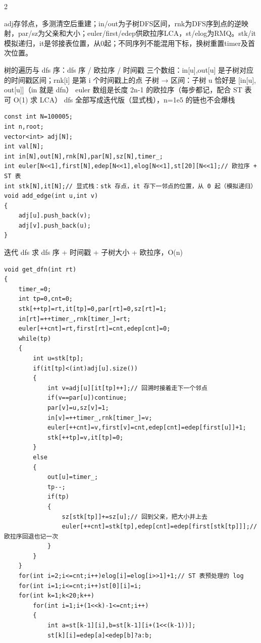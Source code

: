 \documentclass[UTF8,fontset=fandol,a4paper,twoside]{ctexart}
\newcommand{\note}[1]{{\fontsize{10}{12}\selectfont #1\par}}
\begin{document}
\begin{multicols}{2}
\note{adj存邻点，多测清空后重建；in/\allowbreak{}out为子树DFS区间，rnk为DFS序到点的逆映射，par/\allowbreak{}sz为父亲和大小；euler/\allowbreak{}first/\allowbreak{}edep供欧拉序LCA，st/\allowbreak{}elog为RMQ。stk/\allowbreak{}it模拟递归，it是邻接表位置，从0起；不同序列不能混用下标，换树重置timer及首次位置。}
\note{树的遍历与 dfs 序：dfs 序 /\allowbreak{} 欧拉序 /\allowbreak{} 时间戳 三个数组：in[\allowbreak{}u]\allowbreak{},\allowbreak{}out[\allowbreak{}u]\allowbreak{} 是子树对应的时间戳区间；rnk[\allowbreak{}i]\allowbreak{} 是第 i 个时间戳上的点 子树 → 区间：子树 u 恰好是 [\allowbreak{}in[\allowbreak{}u]\allowbreak{},\allowbreak{} out[\allowbreak{}u]\allowbreak{}]\allowbreak{}（in 就是 dfn） euler 数组是长度 2n-\allowbreak{}1 的欧拉序（每步都记，配合 ST 表可 O(\allowbreak{}1)\allowbreak{} 求 LCA） dfs 全部写成迭代版（显式栈），n=\allowbreak{}1e5 的链也不会爆栈}
\begin{lstlisting}
const int N=100005;
int n,root;
vector<int> adj[N];
int val[N];
int in[N],out[N],rnk[N],par[N],sz[N],timer_;
int euler[N<<1],first[N],edep[N<<1],elog[N<<1],st[20][N<<1];// 欧拉序 + ST 表
int stk[N],it[N];// 显式栈：stk 存点，it 存下一邻点的位置，从 0 起（模拟递归）
void add_edge(int u,int v)
{
    adj[u].push_back(v);
    adj[v].push_back(u);
}
\end{lstlisting}
\note{迭代 dfs 求 dfs 序 +\allowbreak{} 时间戳 +\allowbreak{} 子树大小 +\allowbreak{} 欧拉序，O(\allowbreak{}n)\allowbreak{}}
\begin{lstlisting}
void get_dfn(int rt)
{
    timer_=0;
    int tp=0,cnt=0;
    stk[++tp]=rt,it[tp]=0,par[rt]=0,sz[rt]=1;
    in[rt]=++timer_,rnk[timer_]=rt;
    euler[++cnt]=rt,first[rt]=cnt,edep[cnt]=0;
    while(tp)
    {
        int u=stk[tp];
        if(it[tp]<(int)adj[u].size())
        {
            int v=adj[u][it[tp]++];// 回溯时接着走下一个邻点
            if(v==par[u])continue;
            par[v]=u,sz[v]=1;
            in[v]=++timer_,rnk[timer_]=v;
            euler[++cnt]=v,first[v]=cnt,edep[cnt]=edep[first[u]]+1;
            stk[++tp]=v,it[tp]=0;
        }
        else
        {
            out[u]=timer_;
            tp--;
            if(tp)
            {
                sz[stk[tp]]+=sz[u];// 回到父亲，把大小并上去
                euler[++cnt]=stk[tp],edep[cnt]=edep[first[stk[tp]]];// 欧拉序回退也记一次
            }
        }
    }
    for(int i=2;i<=cnt;i++)elog[i]=elog[i>>1]+1;// ST 表预处理的 log
    for(int i=1;i<=cnt;i++)st[0][i]=i;
    for(int k=1;k<20;k++)
        for(int i=1;i+(1<<k)-1<=cnt;i++)
        {
            int a=st[k-1][i],b=st[k-1][i+(1<<(k-1))];
            st[k][i]=edep[a]<edep[b]?a:b;

\end{lstlisting}
\end{multicols}
\end{document}
